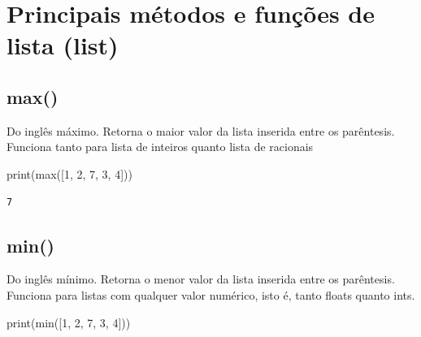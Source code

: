 \documentclass[
  letterpaper,
  DIV=11,
  numbers=noendperiod]{scrreprt}
\newenvironment{Shaded}{\begin{snugshade}}{\end{snugshade}}
\newcommand{\BuiltInTok}[1]{\textcolor[rgb]{0.00,0.23,0.31}{#1}}
\newcommand{\DecValTok}[1]{\textcolor[rgb]{0.68,0.00,0.00}{#1}}
\newcommand{\NormalTok}[1]{\textcolor[rgb]{0.00,0.23,0.31}{#1}}
\begin{document}
\hypertarget{principais-muxe9todos-e-funuxe7uxf5es-de-lista-list}{%
\section{Principais métodos e funções de lista
(list)}\label{principais-muxe9todos-e-funuxe7uxf5es-de-lista-list}}

\hypertarget{max}{%
\subsection{max()}\label{max}}

Do inglês máximo. Retorna o maior valor da lista inserida entre os
parêntesis. Funciona tanto para lista de inteiros quanto lista de
racionais

\begin{Shaded}
\begin{Highlighting}[]
\BuiltInTok{print}\NormalTok{(}\BuiltInTok{max}\NormalTok{([}\DecValTok{1}\NormalTok{, }\DecValTok{2}\NormalTok{, }\DecValTok{7}\NormalTok{, }\DecValTok{3}\NormalTok{, }\DecValTok{4}\NormalTok{]))}
\end{Highlighting}
\end{Shaded}

\begin{tcolorbox}[enhanced jigsaw, breakable, leftrule=.75mm, left=2mm, opacityback=0, bottomrule=.15mm, toprule=.15mm, rightrule=.15mm, arc=.35mm, colback=white]

\begin{verbatim}
7
\end{verbatim}

\end{tcolorbox}

\hypertarget{min}{%
\subsection{min()}\label{min}}

Do inglês mínimo. Retorna o menor valor da lista inserida entre os
parêntesis. Funciona para listas com qualquer valor numérico, isto é,
tanto floats quanto ints.

\begin{Shaded}
\begin{Highlighting}[]
\BuiltInTok{print}\NormalTok{(}\BuiltInTok{min}\NormalTok{([}\DecValTok{1}\NormalTok{, }\DecValTok{2}\NormalTok{, }\DecValTok{7}\NormalTok{, }\DecValTok{3}\NormalTok{, }\DecValTok{4}\NormalTok{]))}
\end{Highlighting}
\end{Shaded}
\end{document}
